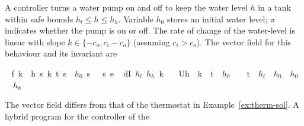 \documentclass[envcountsame,envcountsect]{llncs}
\begin{document}
\begin{example}\label{ex:tank-inv}
  A controller turns a water pump on and off to keep the water level
  $h$ in a tank within safe bounds $h_l\leq h\leq h_h$.  Variable
  $h_0$ stores an initial water level;  $\pi$ indicates whether the pump is
  on or off. The rate of change of the water-level is
  linear with slope $k\in\{-c_o,c_i-c_o\}$ (assuming $c_i>c_o$). The
  vector field for this behaviour and its invariant are
\begin{isabellebody}
\isanewline
{}\ %
{\isachardoublequoteopen}f\ k\ {\isasymequiv}\ {\isasymlbrakk}{\isacharbrackleft}h\ {\isasymmapsto}\isactrlsub s\ k{\isacharcomma}\ t\ {\isasymmapsto}\isactrlsub s\ {}{\isacharcomma}\ $h_0$\ {\isasymmapsto}\isactrlsub s\ {}{\isacharcomma}\ {\isasympi}\ {\isasymmapsto}\isactrlsub s\ {}{\isacharbrackright}{\isasymrbrakk}\isactrlsub e{\isachardoublequoteclose}\isanewline
\isanewline
{}\ %
{\isachardoublequoteopen}dI\ $h_l$\ $h_h$\ k\ {\isasymequiv}\isanewline
\ \ U{\isacharparenleft}h\ {\isacharequal}\ k\ {\isasymcdot}\ t\
{\isacharplus}\ $h_0$\ {\isasymand}\ {}\ {\isasymle}\ t\
{\isasymand}\ $h_l$\ {\isasymle}\ $h_0$\ {\isasymand}\ $h_0$\
{\isasymle}\ $h_h$\ {\isasymand}\ {\isacharparenleft}{\isasympi}\
{\isacharequal}\ {}\ {\isasymor}\ {\isasympi}\
{\isacharequal}\
{}{\isacharparenright}{\isacharparenright}{\isachardoublequoteclose}
\isanewline
\end{isabellebody}
\noindent The vector field differs from that of the thermostat in
Example~\ref{ex:therm-sol}. A hybrid program for the controller of the

\end{example}
\end{document}
